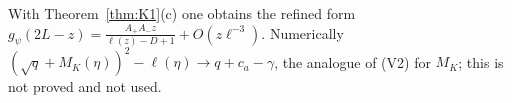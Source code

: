 \documentclass[11pt]{amsart}
\theoremstyle{definition}
\theoremstyle{remark}
\numberwithin{equation}{section}
\begin{document}
With Theorem~\ref{thm:K1}(c) one obtains the refined form $g_\psi(2L-z)=\frac{A_+A_-z}{\ell(z)-D+1}+O(z\ell^{-3})$. Numerically $(\sqrt q+M_K(\eta))^2-\ell(\eta)\to q+c_a-\gamma$, the analogue of (V2) for $M_K$; this is not proved and not used.

\begingroup\footnotesize\raggedright


\endgroup
\end{document}
